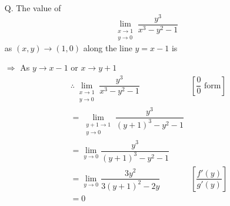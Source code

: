 \large
\ttfamily
\addtolength{\jot}{2ex}
\begin{itemize}
\item[Q.] The value of 
\[
\lim_{\substack{x\to 1\\y\to 0}} \dfrac{y^3}{x^3-y^2-1}
\]
as $(x, y)\to (1, 0)$ along the line $y=x-1$ is

\item[$\Rightarrow$] As $y\to x-1$ or $x\to y + 1$ \\

\begin{align*}
&\therefore \lim_{\substack{x\to 1\\y\to 0}} \dfrac{y^3}{x^3-y^2-1} &\left[\dfrac{0}{0} \text{ form}\right]\\
	&= \lim_{\substack{y+1\to 1\\y\to 0}} \dfrac{y^3}{(y+1)^3-y^2-1} \\
	&=\lim_{y\to 0} \dfrac{y^3}{(y+1)^3-y^2-1} \\
	&=\lim_{y\to 0} \dfrac{3y^2}{3(y+1)^2-2y} &\left[\dfrac{f'(y)}{g'(y)}\right] \\
	&= 0
\end{align*}
\end{itemize}

